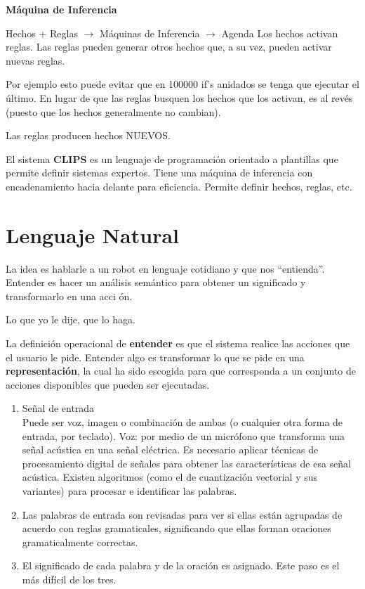 \textbf{Máquina de Inferencia}


Hechos + Reglas $\rightarrow$ Máquinas de Inferencia $\rightarrow$ Agenda
Los hechos activan reglas. Las reglas pueden generar otros hechos que, a su vez, pueden activar nuevas
reglas.

Por ejemplo esto puede evitar que en 100000 if’s anidados se tenga que ejecutar el último.
En lugar de que las reglas busquen los hechos que los activan, es al revés (puesto que los hechos
generalmente no cambian).


Las reglas producen hechos NUEVOS.

El sistema \textbf{CLIPS} es un lenguaje de programación orientado a plantillas que permite definir sistemas
expertos. Tiene una máquina de inferencia con encadenamiento hacia delante para eficiencia.
Permite definir hechos, reglas, etc.


\section{Lenguaje Natural}

La idea es hablarle a un robot en lenguaje cotidiano y que nos “entienda”. Entender es hacer un análisis
semántico para obtener un significado y transformarlo en una acci
ón.

Lo que yo le dije, que lo haga.

La definición operacional de \textbf{entender} es que el sistema realice las acciones que el usuario le pide.
Entender algo es transformar lo que se pide en una \textbf{representación}, la cual ha sido escogida para que
corresponda a un conjunto de acciones disponibles que pueden ser ejecutadas.


\begin{enumerate}[1.]
	\item Señal de entrada \\
	Puede ser voz, imagen o combinación de ambas (o cualquier otra forma de entrada, por teclado).
	Voz: por medio de un micrófono que transforma una señal acústica en una señal eléctrica.
	Es necesario aplicar técnicas de procesamiento digital de señales para obtener las características de
	esa señal acústica.
	Existen algoritmos (como el de cuantización vectorial y sus variantes) para procesar e identificar las
	palabras.
	
	\item Las palabras de entrada son revisadas para ver si ellas están agrupadas de acuerdo con reglas
	gramaticales, significando que ellas forman oraciones gramaticalmente correctas.
	
	\item El significado de cada palabra y de la oración es asignado.
	Este paso es el más difícil de los tres.
	
\end{enumerate}



